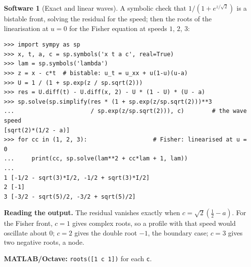 \documentclass[11pt,a4paper]{article}
\numberwithin{equation}{section}
\theoremstyle{definition}
\newtheorem{software}[thm]{Software}
\begin{document}
\begin{software}[Exact and linear waves]
\label{sw:waves}
A symbolic check that $1/(1 + e^{z/\sqrt2})$ is a bistable front, solving the residual for the speed; then the roots of the linearisation at $u = 0$ for the Fisher equation at speeds $1$, $2$, $3$:
{\small\begin{verbatim}
>>> import sympy as sp
>>> x, t, a, c = sp.symbols('x t a c', real=True)
>>> lam = sp.symbols('lambda')
>>> z = x - c*t  # bistable: u_t = u_xx + u(1-u)(u-a)
>>> U = 1 / (1 + sp.exp(z / sp.sqrt(2)))
>>> res = U.diff(t) - U.diff(x, 2) - U * (1 - U) * (U - a)
>>> sp.solve(sp.simplify(res * (1 + sp.exp(z/sp.sqrt(2)))**3
...                      / sp.exp(z/sp.sqrt(2))), c)        # the wave speed
[sqrt(2)*(1/2 - a)]
>>> for cc in (1, 2, 3):                   # Fisher: linearised at u = 0
...     print(cc, sp.solve(lam**2 + cc*lam + 1, lam))
...
1 [-1/2 - sqrt(3)*I/2, -1/2 + sqrt(3)*I/2]
2 [-1]
3 [-3/2 - sqrt(5)/2, -3/2 + sqrt(5)/2]
\end{verbatim}}
\textbf{Reading the output.} The residual vanishes exactly when $c = \sqrt2(\frac12 - a)$. For the Fisher front, $c = 1$ gives complex roots, so a profile with that speed would oscillate about $0$; $c = 2$ gives the double root $-1$, the boundary case; $c = 3$ gives two negative roots, a node.

\textbf{MATLAB/Octave:} \texttt{roots([1 c 1])} for each \texttt{c}.
\end{software}
\end{document}
